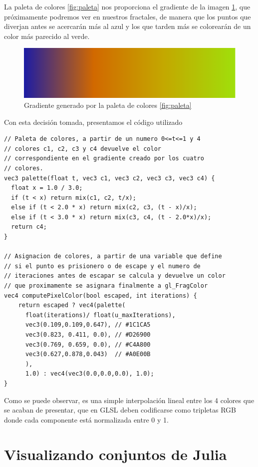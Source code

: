La paleta de colores \ref{fig:paleta} nos proporciona el gradiente de la imagen \ref{fig:gradiente}, que próximamente podremos ver en nuestros fractales, de manera que los puntos que diverjan antes se acercarán más al azul y los que tarden más se colorearán de un color más parecido al verde.

\begin{figure} [ht]
    \centering
    \includegraphics[scale = 0.51]{img/C7/gradiente.png}
    \caption{Gradiente generado por la paleta de colores \ref{fig:paleta}}
    \label{fig:gradiente}
\end{figure}

Con esta decisión tomada, presentamos el código utilizado

\begin{lstlisting}
// Paleta de colores, a partir de un numero 0<=t<=1 y 4 
// colores c1, c2, c3 y c4 devuelve el color 
// correspondiente en el gradiente creado por los cuatro 
// colores.
vec3 palette(float t, vec3 c1, vec3 c2, vec3 c3, vec3 c4) {
  float x = 1.0 / 3.0;
  if (t < x) return mix(c1, c2, t/x);
  else if (t < 2.0 * x) return mix(c2, c3, (t - x)/x);
  else if (t < 3.0 * x) return mix(c3, c4, (t - 2.0*x)/x);
  return c4;
}

// Asignacion de colores, a partir de una variable que define
// si el punto es prisionero o de escape y el numero de 
// iteraciones antes de escapar se calcula y devuelve un color 
// que proximamente se asignara finalmente a gl_FragColor
vec4 computePixelColor(bool escaped, int iterations) {
    return escaped ? vec4(palette(
      float(iterations)/ float(u_maxIterations),
      vec3(0.109,0.109,0.647), // #1C1CA5
      vec3(0.823, 0.411, 0.0), // #D26900
      vec3(0.769, 0.659, 0.0), // #C4A800
      vec3(0.627,0.878,0.043)  // #A0E00B
      ), 
      1.0) : vec4(vec3(0.0,0.0,0.0), 1.0);
}
\end{lstlisting}

Como se puede observar, es una simple interpolación lineal entre los 4 colores que se acaban de presentar, que en GLSL deben codificarse como tripletas RGB donde cada componente está normalizada entre 0 y 1.

\section{Visualizando conjuntos de Julia}
\label{section:grafica-julia}

